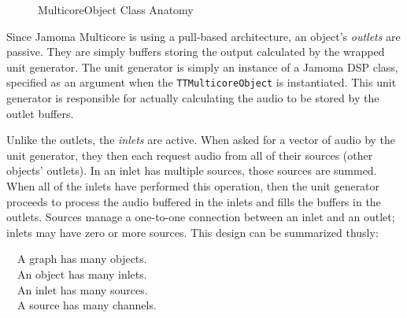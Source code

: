 \documentclass[twoside,a4paper]{article}
\begin{document}
\begin{figure}[htbp]
\centerline{}
\caption{MulticoreObject Class Anatomy}
\label{fig:anatomy}
\end{figure}

Since Jamoma Multicore is using a pull-based architecture, an object's \emph{outlets} are passive.  They are simply buffers storing the output calculated by the wrapped unit generator.  The unit generator is simply an instance of a Jamoma DSP class, specified as an argument when the \texttt{TTMulticoreObject} is instantiated.  This unit generator is responsible for actually calculating the audio to be stored by the outlet buffers.

Unlike the outlets, the \emph{inlets} are active.  When asked for a vector of audio by the unit generator, they then each request audio from all of their sources (other objects' outlets).  In an inlet has multiple sources, those sources are summed.  When all of the inlets have performed this operation, then the unit generator proceeds to process the audio buffered in the inlets and fills the buffers in the outlets.  Sources manage a one-to-one connection between an inlet and an outlet; inlets may have zero or more sources.  This design can be summarized thusly:

\	\	A graph has many objects.\\
\	\	An object has many inlets.\\
\	\	An inlet has many sources.\\
\	\	A source has many channels.\\
\end{document}
